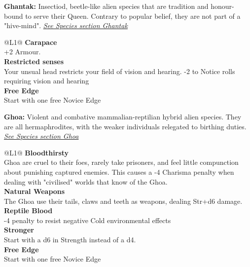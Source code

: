 \begin{enumerate}
  \hline
  
  \textbf{Ghantak:} Insectiod, beetle-like alien species that are tradition and honour-bound to serve their Queen. Contrary to popular belief, they are not part of a "hive-mind". \textit{\hyperref[sec:specie-ghantak]{See Species section Ghantak}}
  \begin{redtable}{\linewidth}{@{}L{1}@{}}
    \textbf{Carapace}\\
    +2 Armour.\\
    \textbf{Restricted senses}\\
    Your unsual head restricts your field of vision and hearing. -2 to Notice rolls requiring vision and hearing\\
    \textbf{Free Edge}\\
    Start with one free Novice Edge\\
  \end{redtable}
  
  \hline
  
  \textbf{Ghoa:} Violent and combative mammalian-reptilian hybrid alien species. They are all hermaphrodites, with the weaker individuals relegated to birthing duties. \textit{\hyperref[sec:specie-ghoa]{See Species section Ghoa}}
  \begin{redtable}{\linewidth}{@{}L{1}@{}}
    \textbf{Bloodthirsty}\\
    Ghoa are cruel to their foes, rarely take prisoners, and feel little compunction about punishing captured enemies. This causes a -4 Charisma penalty when dealing with "civilised" worlds that know of the Ghoa.\\
    \textbf{Natural Weapons}\\
    The Ghoa use their tails, claws and teeth as weapons, dealing Str+d6 damage.\\
    \textbf{Reptile Blood}\\
    -4 penalty to resist negative Cold environmental effects\\
    \textbf{Stronger}\\
    Start with a d6 in Strength instead of a d4.\\
    \textbf{Free Edge}\\
    Start with one free Novice Edge\\
  \end{redtable}
  
  \hline
  

\end{enumerate}
